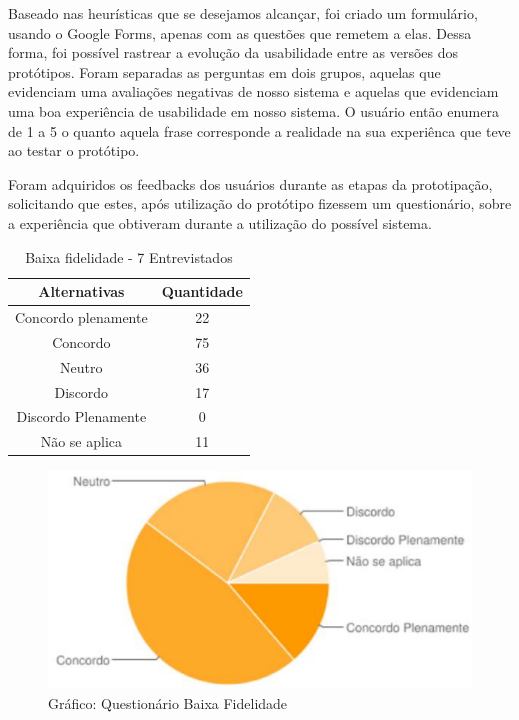 Baseado nas heurísticas que se desejamos alcançar, foi criado um formulário, usando o Google Forms, apenas com as questões que remetem a elas. Dessa forma, foi possível  rastrear a evolução da usabilidade entre as versões dos protótipos. Foram separadas as perguntas em dois grupos, aquelas que evidenciam uma avaliações negativas de nosso sistema e aquelas que evidenciam uma boa experiência de usabilidade em nosso sistema. O usuário então enumera de 1 a 5 o quanto aquela frase corresponde a realidade na sua experiênca que teve ao testar o protótipo.

Foram adquiridos os feedbacks dos usuários durante as etapas da prototipação, solicitando que estes, após utilização do protótipo fizessem um questionário, sobre a experiência que obtiveram durante a utilização do possível sistema.

\begin{table}[H]
	\centering
	\begin{tabular}{|c|c|}
		\hline 
		\textbf{Alternativas} & \textbf{Quantidade}\tabularnewline
		\hline 
		\hline 
		Concordo plenamente & 22\tabularnewline
		\hline 
		Concordo & 75\tabularnewline
		\hline 
		Neutro & 36\tabularnewline
		\hline 
		Discordo & 17\tabularnewline
		\hline 
		Discordo Plenamente & 0\tabularnewline
		\hline 
		Não se aplica & 11\tabularnewline
		\hline 
	\end{tabular}
	\caption{Baixa fidelidade - 7 Entrevistados}
	\label{Metas_x_Questionario}
\end{table}

\begin{figure}[H]
	\begin{center}
		\includegraphics[keepaspectratio,scale=0.6]{figuras/grafico_questionario_baixa_fidelidade.eps}
		\caption{Gráfico: Questionário Baixa Fidelidade}
	\end{center}
\end{figure}

